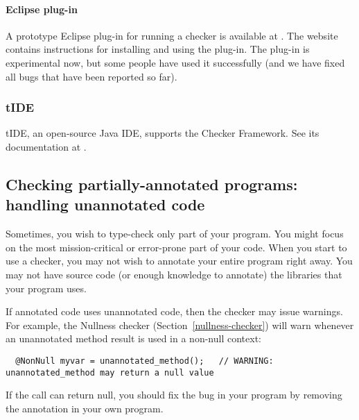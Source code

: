 \paragraph{Eclipse plug-in}

A prototype Eclipse plug-in for running a checker is available at
.  
The website contains instructions for installing and using the plug-in.
The plug-in is
experimental now, but some people have used it successfully (and we have fixed
all bugs that have been reported so far).


\subsubsection{tIDE}

tIDE, an open-source Java IDE, supports the Checker Framework.  See its
documentation at .


\subsection{Checking partially-annotated programs:  handling unannotated code\label{unannotated-code}}

Sometimes, you wish to type-check only part of your program.  
You might focus on the most mission-critical or error-prone part of your
code.  When you start to use a checker, you may not wish to annotate
your entire program right away.  You may not have source code (or
enough knowledge to annotate) the libraries that your program uses.

If annotated code uses unannotated code, then the checker may issue
warnings.  For example, the Nullness checker (Section~\ref{nullness-checker}) will
warn whenever an unannotated method result is used in a non-null context:

\begin{Verbatim}
  @NonNull myvar = unannotated_method();   // WARNING: unannotated_method may return a null value
\end{Verbatim}

If the call can return null, you should fix the bug in your program by
removing the  annotation in your own program.

